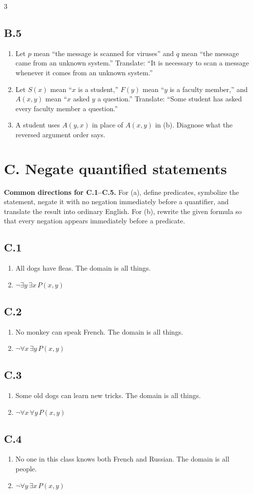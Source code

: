 \documentclass{article}
\newcommand{\problem}[1]{%
  \par
  \subsection*{#1}%
}
\begin{document}
\begin{multicols}{3}
\problem{B.5}
\begin{enumerate}[label=(\alph*)]
  \item Let $p$ mean ``the message is scanned for viruses'' and $q$ mean ``the
        message came from an unknown system.'' Translate: ``It is necessary to
        scan a message whenever it comes from an unknown system.''
  \item Let $S(x)$ mean ``$x$ is a student,'' $F(y)$ mean ``$y$ is a faculty
        member,'' and $A(x,y)$ mean ``$x$ asked $y$ a question.'' Translate:
        ``Some student has asked every faculty member a question.''
  \item A student uses $A(y,x)$ in place of $A(x,y)$ in (b). Diagnose what the
        reversed argument order says.
\end{enumerate}
\section*{C. Negate quantified statements}

\textbf{Common directions for C.1--C.5.} For (a), define predicates, symbolize
the statement, negate it with no negation immediately before a quantifier, and
translate the result into ordinary English. For (b), rewrite the given formula
so that every negation appears immediately before a predicate.

\problem{C.1}
\begin{enumerate}[label=(\alph*)]
  \item All dogs have fleas. The domain is all things.
  \item $\neg\exists y\,\exists x\,P(x,y)$
\end{enumerate}

\problem{C.2}
\begin{enumerate}[label=(\alph*)]
  \item No monkey can speak French. The domain is all things.
  \item $\neg\forall x\,\exists y\,P(x,y)$
\end{enumerate}

\columnbreak
\problem{C.3}
\begin{enumerate}[label=(\alph*)]
  \item Some old dogs can learn new tricks. The domain is all things.
  \item $\neg\forall x\,\forall y\,P(x,y)$
\end{enumerate}

\problem{C.4}
\begin{enumerate}[label=(\alph*)]
  \item No one in this class knows both French and Russian. The domain is all
        people.
  \item $\neg\forall y\,\exists x\,P(x,y)$
\end{enumerate}


\end{multicols}
\end{document}
